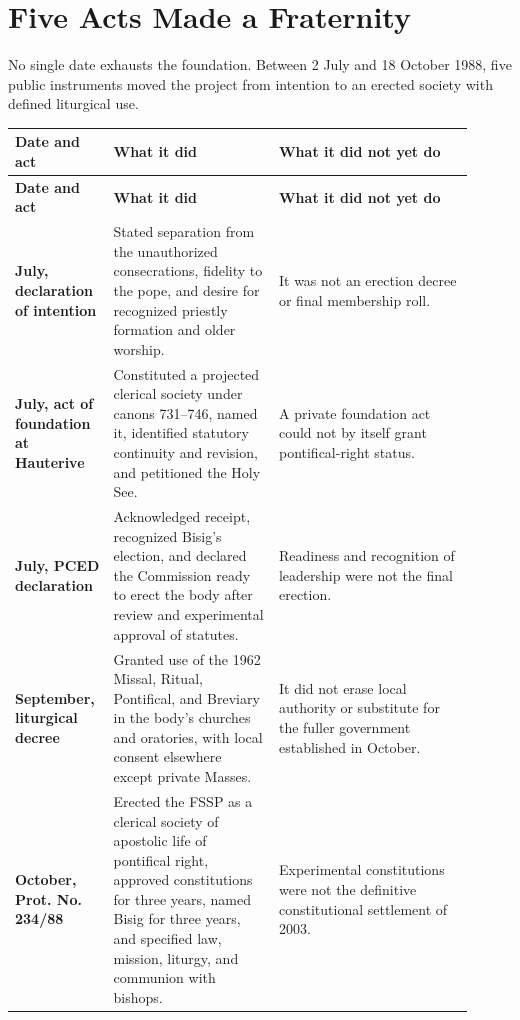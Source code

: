 \section{Five Acts Made a Fraternity}

No single date exhausts the foundation. Between 2 July and 18 October 1988, five public instruments moved the project from intention to an erected society with defined liturgical use.

\begin{longtable}{>{\bfseries\RaggedRight\arraybackslash}p{0.17\linewidth}>{\RaggedRight\arraybackslash}p{0.34\linewidth}>{\RaggedRight\arraybackslash}p{0.40\linewidth}}
\toprule
\textbf{Date and act} & \textbf{What it did} & \textbf{What it did not yet do}\\
\midrule
\endfirsthead
\toprule
\textbf{Date and act} & \textbf{What it did} & \textbf{What it did not yet do}\\
\midrule
\endhead
\bottomrule
\endfoot
2 July, declaration of intention & Stated separation from the unauthorized consecrations, fidelity to the pope, and desire for recognized priestly formation and older worship. & It was not an erection decree or final membership roll.\\
18 July, act of foundation at Hauterive & Constituted a projected clerical society under canons 731--746, named it, identified statutory continuity and revision, and petitioned the Holy See. & A private foundation act could not by itself grant pontifical-right status.\\
22 July, PCED declaration & Acknowledged receipt, recognized Bisig's election, and declared the Commission ready to erect the body after review and experimental approval of statutes. & Readiness and recognition of leadership were not the final erection.\\
10 September, liturgical decree & Granted use of the 1962 Missal, Ritual, Pontifical, and Breviary in the body's churches and oratories, with local consent elsewhere except private Masses. & It did not erase local authority or substitute for the fuller government established in October.\\
18 October, Prot. No. 234/88 & Erected the FSSP as a clerical society of apostolic life of pontifical right, approved constitutions for three years, named Bisig for three years, and specified law, mission, liturgy, and communion with bishops. & Experimental constitutions were not the definitive constitutional settlement of 2003.\\
\end{longtable}

